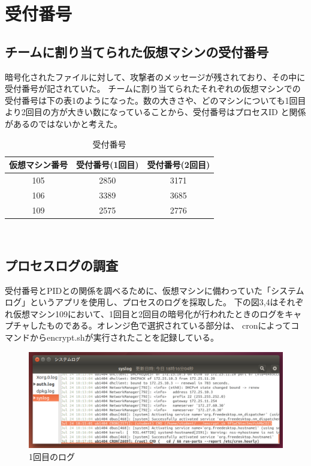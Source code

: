 \documentclass[dvipdfmx,autodetect-engine,titlepage]{jsarticle}
\begin{document}
\section{受付番号}
\subsection{チームに割り当てられた仮想マシンの受付番号}
暗号化されたファイルに対して、攻撃者のメッセージが残されており、その中に受付番号が記されていた。
チームに割り当てられたそれぞれの仮想マシンでの受付番号は下の表1のようになった。数の大きさや、どのマシンについても1回目より2回目の方が大きい数になっていることから、受付番号はプロセスID
と関係があるのではないかと考えた。

\begin{table}[H]
  \centering
  \caption{受付番号}
  \begin{tabular}{|c|c|c|}
  \hline
  仮想マシン番号 & 受付番号(1回目) & 受付番号(2回目) \\ \hline
  105   & 2850      & 3171      \\ \hline
  106   & 3389      & 3685      \\ \hline
  109   & 2575      & 2776     \\ \hline
  \end{tabular}
\end{table}
　
\subsection{プロセスログの調査}
受付番号とPIDとの関係を調べるために、仮想マシンに備わっていた「システムログ」というアプリを使用し、プロセスのログを採取した。
下の図3,4はそれぞれ仮想マシン109において、1回目と2回目の暗号化が行われたときのログをキャプチャしたものである。オレンジ色で選択されている部分は、
cronによってコマンドからencrypt.shが実行されたことを記録している。

\begin{figure}[H]
  \centering
  \includegraphics[scale=0.5]{in3.png}
  \caption{1回目のログ}\label{fig:図3}
\end{figure}
\end{document}
